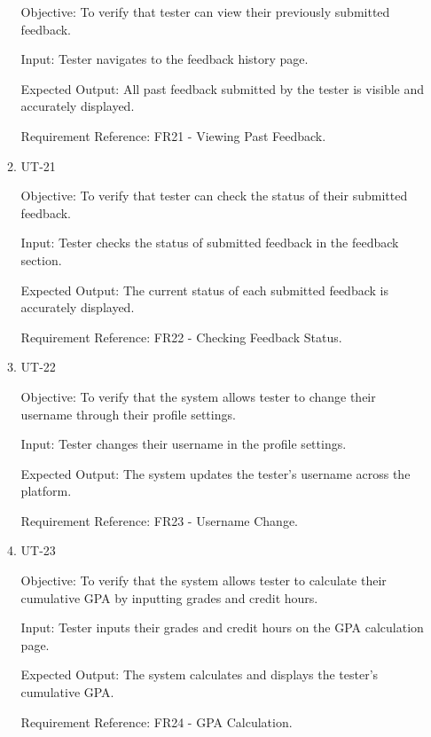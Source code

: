 \documentclass[12pt, titlepage]{article}
\begin{document}
\begin{enumerate}
\begin{enumerate}
        Objective: To verify that tester can view their previously submitted feedback.
        
        Input: Tester navigates to the feedback history page.
        
        Expected Output: All past feedback submitted by the tester is visible and accurately displayed.
        
        Requirement Reference: FR21 - Viewing Past Feedback.
        
    \item{UT-21\\}\label{UT-21}
    
        Objective: To verify that tester can check the status of their submitted feedback.
        
        Input: Tester checks the status of submitted feedback in the feedback section.
        
        Expected Output: The current status of each submitted feedback is accurately displayed.
        
        Requirement Reference: FR22 - Checking Feedback Status.
        
    \item{UT-22\\}\label{UT-22}
    
        Objective: To verify that the system allows tester to change their username through their profile settings.
        
        Input: Tester changes their username in the profile settings.
        
        Expected Output: The system updates the tester's username across the platform.
        
        Requirement Reference: FR23 - Username Change.
        
    \item{UT-23\\}\label{UT-23}
    
        Objective: To verify that the system allows tester to calculate their cumulative GPA by inputting grades and credit hours.
        
        Input: Tester inputs their grades and credit hours on the GPA calculation page.
        
        Expected Output: The system calculates and displays the tester's cumulative GPA.
        
        Requirement Reference: FR24 - GPA Calculation.
\end{enumerate}


\end{enumerate}
\end{document}
